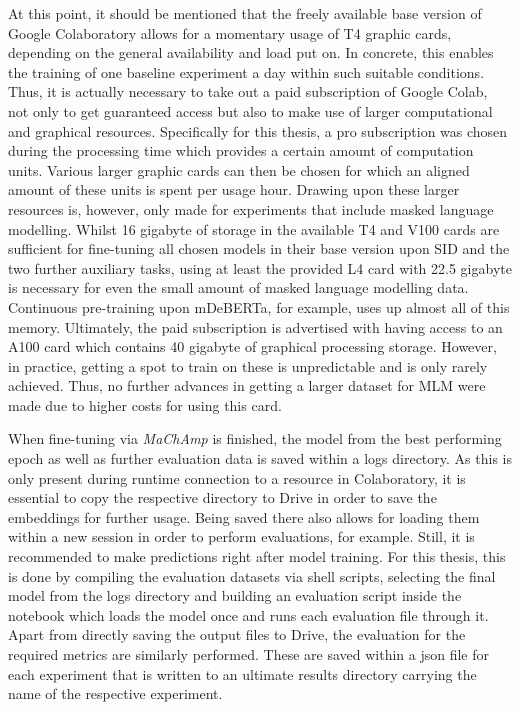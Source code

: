 \documentclass[11pt,a4paper,twoside,openright]{scrbook}
\begin{document}
At this point, it should be mentioned that the freely available base version of Google Colaboratory allows for a momentary usage of T4 graphic cards, depending on the general availability and load put on. In concrete, this enables the training of one baseline experiment a day within such suitable conditions. Thus, it is actually necessary to take out a paid subscription of Google Colab, not only to get guaranteed access but also to make use of larger computational and graphical resources. Specifically for this thesis, a pro subscription was chosen during the processing time which provides a certain amount of computation units. Various larger graphic cards can then be chosen for which an aligned amount of these units is spent per usage hour. Drawing upon these larger resources is, however, only made for experiments that include masked language modelling. Whilst 16 gigabyte of storage in the available T4 and V100 cards are sufficient for fine-tuning all chosen models in their base version upon SID and the two further auxiliary tasks, using at least the provided L4 card with 22.5 gigabyte is necessary for even the small amount of masked language modelling data. Continuous pre-training upon mDeBERTa, for example, uses up almost all of this memory. Ultimately, the paid subscription is advertised with having access to an A100 card which contains 40 gigabyte of graphical processing storage. However, in practice, getting a spot to train on these is unpredictable and is only rarely achieved. Thus, no further advances in getting a larger dataset for MLM were made due to higher costs for using this card.

When fine-tuning via \textit{MaChAmp} is finished, the model from the best performing epoch as well as further evaluation data is saved within a logs directory. As this is only present during runtime connection to a resource in Colaboratory, it is essential to copy the respective directory to Drive in order to save the embeddings for further usage. Being saved there also allows for loading them within a new session in order to perform evaluations, for example. Still, it is recommended to make predictions right after model training. For this thesis, this is done by compiling the evaluation datasets via shell scripts, selecting the final model from the logs directory and building an evaluation script inside the notebook which loads the model once and runs each evaluation file through it. Apart from directly saving the output files to Drive, the evaluation for the required metrics are similarly performed. These are saved within a json file for each experiment that is written to an ultimate results directory carrying the name of the respective experiment.
\end{document}
